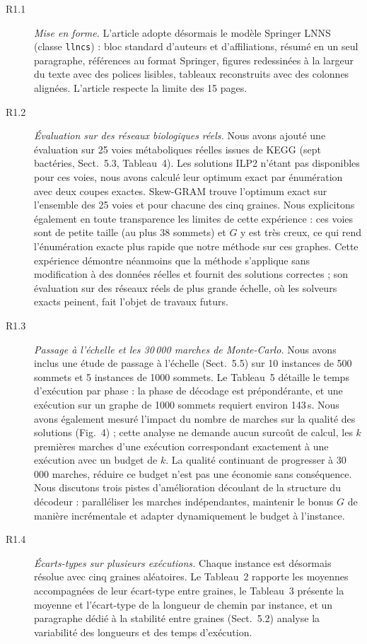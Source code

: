 \begin{description}
\item[R1.1] \emph{Mise en forme.} L'article adopte désormais le modèle Springer LNNS (classe \texttt{llncs}) : bloc standard d'auteurs et d'affiliations, résumé en un seul paragraphe, références au format Springer, figures redessinées à la largeur du texte avec des polices lisibles, tableaux reconstruits avec des colonnes alignées. L'article respecte la limite des 15 pages.

\item[R1.2] \emph{Évaluation sur des réseaux biologiques réels.} Nous avons ajouté une évaluation sur 25 voies métaboliques réelles issues de KEGG (sept bactéries, Sect.~5.3, Tableau~4). Les solutions ILP2 n'étant pas disponibles pour ces voies, nous avons calculé leur optimum exact par énumération avec deux coupes exactes. Skew-GRAM trouve l'optimum exact sur l'ensemble des 25 voies et pour chacune des cinq graines. Nous explicitons également en toute transparence les limites de cette expérience : ces voies sont de petite taille (au plus 38 sommets) et $G$ y est très creux, ce qui rend l'énumération exacte plus rapide que notre méthode sur ces graphes. Cette expérience démontre néanmoins que la méthode s'applique sans modification à des données réelles et fournit des solutions correctes ; son évaluation sur des réseaux réels de plus grande échelle, où les solveurs exacts peinent, fait l'objet de travaux futurs.

\item[R1.3] \emph{Passage à l'échelle et les 30\,000 marches de Monte-Carlo.} Nous avons inclus une étude de passage à l'échelle (Sect.~5.5) sur 10 instances de 500 sommets et 5 instances de 1000 sommets. Le Tableau~5 détaille le temps d'exécution par phase : la phase de décodage est prépondérante, et une exécution sur un graphe de 1000 sommets requiert environ 143\,s. Nous avons également mesuré l'impact du nombre de marches sur la qualité des solutions (Fig.~4) ; cette analyse ne demande aucun surcoût de calcul, les $k$ premières marches d'une exécution correspondant exactement à une exécution avec un budget de $k$. La qualité continuant de progresser à 30\,000 marches, réduire ce budget n'est pas une économie sans conséquence. Nous discutons trois pistes d'amélioration découlant de la structure du décodeur : paralléliser les marches indépendantes, maintenir le bonus $G$ de manière incrémentale et adapter dynamiquement le budget à l'instance.

\item[R1.4] \emph{Écarts-types sur plusieurs exécutions.} Chaque instance est désormais résolue avec cinq graines aléatoires. Le Tableau~2 rapporte les moyennes accompagnées de leur écart-type entre graines, le Tableau~3 présente la moyenne et l'écart-type de la longueur de chemin par instance, et un paragraphe dédié à la stabilité entre graines (Sect.~5.2) analyse la variabilité des longueurs et des temps d'exécution.
\end{description}

